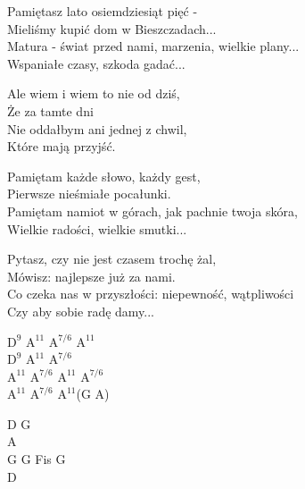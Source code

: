 \begin{text}
\small{
Pamiętasz lato osiemdziesiąt pięć -\\
Mieliśmy kupić dom w Bieszczadach...\\
Matura - świat przed nami, marzenia, wielkie plany...\\
Wspaniałe czasy, szkoda gadać...

\vin Ale wiem i wiem to nie od dziś,\\
\vin Że za tamte dni\\
\vin Nie oddałbym ani jednej z chwil,\\
\vin Które mają przyjść.

Pamiętam każde słowo, każdy gest,\\
Pierwsze nieśmiałe pocałunki.\\
Pamiętam namiot w górach, jak pachnie twoja skóra,\\
Wielkie radości, wielkie smutki...

Pytasz, czy nie jest czasem trochę żal,\\
Mówisz: najlepsze już za nami.\\
Co czeka nas w przyszłości: niepewność, wątpliwości\\
Czy aby sobie radę damy...
}
\end{text}
\begin{chord}
\small{
$\mathrm{D^{9}}$ $\mathrm{A^{11}}$ $\mathrm{A^{7/6}}$ $\mathrm{A^{11}}$\\
$\mathrm{D^{9}}$ $\mathrm{A^{11}}$ $\mathrm{A^{7/6}}$\\
$\mathrm{A^{11}}$ $\mathrm{A^{7/6}}$ $\mathrm{A^{11}}$ $\mathrm{A^{7/6}}$\\
$\mathrm{A^{11}}$ $\mathrm{A^{7/6}}$ $\mathrm{A^{11}}$(G A)

D G\\
A\\
G G Fis G\\
D
}
\end{chord}
